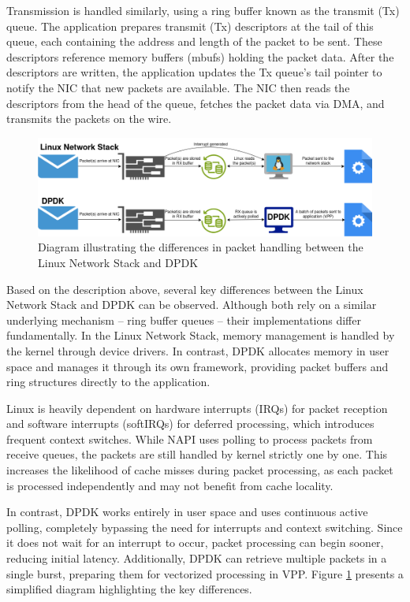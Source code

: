Transmission is handled similarly, using a ring buffer known as the transmit (Tx) queue.
The application prepares transmit (Tx) descriptors at the tail of this queue, each containing the address and length of the packet to be sent.
These descriptors reference memory buffers (mbufs) holding the packet data. 
After the descriptors are written, the application updates the Tx queue’s tail pointer to notify the NIC that new packets are available.
The NIC then reads the descriptors from the head of the queue, fetches the packet data via DMA, and transmits the packets on the wire.~\cite{intel-pcie-traffic-2025}

\begin{figure}[!htbp]
    \centering
    \includegraphics[width=0.99\linewidth]{images/dpdk-vs-linux.png}
    \caption{Diagram illustrating the differences in packet handling between the Linux Network Stack and DPDK~\cite{linux-packet-input, linux-rss, intel-core-utilization-2025, intel-pcie-traffic-2025}}
    \label{fig:dpdk}
\end{figure}

Based on the description above, several key differences between the Linux Network Stack and DPDK can be observed.
Although both rely on a similar underlying mechanism -- ring buffer queues -- their implementations differ fundamentally.
In the Linux Network Stack, memory management is handled by the kernel through device drivers. 
In contrast, DPDK allocates memory in user space and manages it through its own framework, providing packet buffers and ring structures directly to the application.

Linux is heavily dependent on hardware interrupts (IRQs) for packet reception and software interrupts (softIRQs) for deferred processing, which introduces frequent context switches. 
While NAPI uses polling to process packets from receive queues, the packets are still handled by kernel strictly one by one.
This increases the likelihood of cache misses during packet processing, as each packet is processed independently and may not benefit from cache locality.

In contrast, DPDK works entirely in user space and uses continuous active polling, completely bypassing the need for interrupts and context switching. 
Since it does not wait for an interrupt to occur, packet processing can begin sooner, reducing initial latency. 
Additionally, DPDK can retrieve multiple packets in a single burst, preparing them for vectorized processing in VPP.
Figure \ref{fig:dpdk} presents a simplified diagram highlighting the key differences.


